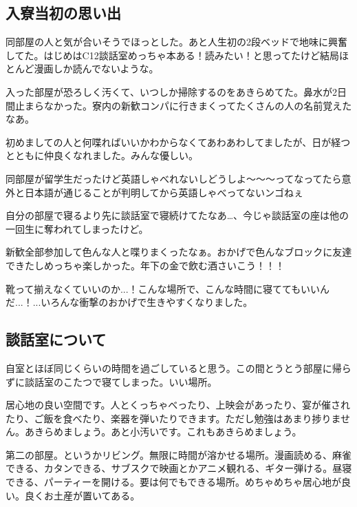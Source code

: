 \begin{multicols}{2}
  

  \subsection{入寮当初の思い出}

  同部屋の人と気が合いそうでほっとした。あと人生初の2段ベッドで地味に興奮してた。はじめはC12談話室めっちゃ本ある！読みたい！と思ってたけど結局ほとんど漫画しか読んでないような。

  入った部屋が恐ろしく汚くて、いつしか掃除するのをあきらめてた。鼻水が2日間止まらなかった。寮内の新歓コンパに行きまくってたくさんの人の名前覚えたなあ。

  初めましての人と何喋ればいいかわからなくてあわあわしてましたが、日が経つとともに仲良くなれました。みんな優しい。

  同部屋が留学生だったけど英語しゃべれないしどうしよ～～～ってなってたら意外と日本語が通じることが判明してから英語しゃべってないンゴねぇ

  自分の部屋で寝るより先に談話室で寝続けてたなあ…、今じゃ談話室の座は他の一回生に奪われてしまったけど。

  新歓全部参加して色んな人と喋りまくったなぁ。おかげで色んなブロックに友達できたしめっちゃ楽しかった。年下の金で飲む酒さいこう！！！

  靴って揃えなくていいのか...！こんな場所で、こんな時間に寝ててもいいんだ...！...いろんな衝撃のおかげで生きやすくなりました。



  \subsection{談話室について}

  自室とほぼ同じくらいの時間を過ごしていると思う。この間とうとう部屋に帰らずに談話室のこたつで寝てしまった。いい場所。

  居心地の良い空間です。人とくっちゃべったり、上映会があったり、宴が催されたり、ご飯を食べたり、楽器を弾いたりできます。ただし勉強はあまり捗りません。あきらめましょう。あと小汚いです。これもあきらめましょう。

  第二の部屋。というかリビング。無限に時間が溶かせる場所。漫画読める、麻雀できる、カタンできる、サブスクで映画とかアニメ観れる、ギター弾ける。昼寝できる、パーティーを開ける。要は何でもできる場所。めちゃめちゃ居心地が良い。良くお土産が置いてある。


\end{multicols}
